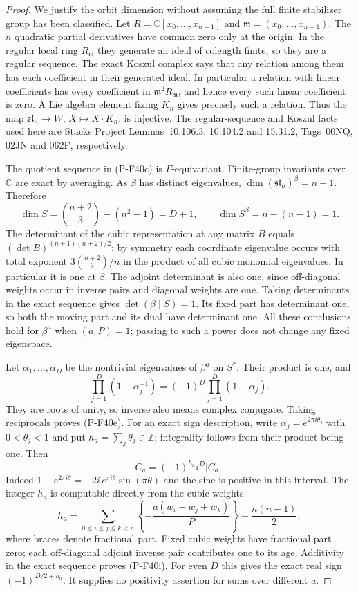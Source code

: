 \documentclass[11pt,a4paper]{article}
\begin{document}
\begin{proof}
We justify the orbit dimension without assuming the full
finite stabilizer group has been classified. Let
$R=\mathbb C[x_0,\ldots,x_{n-1}]$ and
$\mathfrak m=(x_0,\ldots,x_{n-1})$.
The $n$ quadratic partial derivatives have common zero only
at the origin. In the regular local ring $R_{\mathfrak m}$
they generate an ideal of colength finite, so they are a
regular sequence. The exact Koszul complex says that any
relation among them has each coefficient in their generated
ideal. In particular a relation with linear coefficients
has every coefficient in $\mathfrak m^2R_{\mathfrak m}$,
and hence every such linear coefficient is zero.
A Lie algebra element fixing $K_n$ gives precisely such a
relation. Thus the map
$\mathfrak{sl}_n\to W$, $X\mapsto X\cdot K_n$,
is injective. The regular-sequence and Koszul facts used
here are Stacks Project Lemmas~10.106.3, 10.104.2 and
15.31.2, Tags~00NQ, 02JN and 062F, respectively.

The quotient sequence in (P-F40c) is $\Gamma$-equivariant.
Finite-group invariants over $\mathbb C$ are exact by
averaging. As $\beta$ has distinct eigenvalues,
$\dim(\mathfrak{sl}_n)^\beta=n-1$. Therefore
\[
 \dim S=\binom{n+2}{3}-(n^2-1)=D+1,
 \qquad \dim S^\beta=n-(n-1)=1.
\]
The determinant of the cubic representation at any matrix
$B$ equals $(\det B)^{(n+1)(n+2)/2}$: by symmetry each
coordinate eigenvalue occurs with total exponent
$3\binom{n+2}{3}/n$ in the product of all cubic monomial
eigenvalues. In particular it is one at $\beta$.
The adjoint determinant is also one, since off-diagonal
weights occur in inverse pairs and diagonal weights are one.
Taking determinants in the exact sequence gives
$\det(\beta\mid S)=1$. Its fixed part has determinant one,
so both the moving part and its dual have determinant one.
All these conclusions hold for $\beta^a$ when $(a,P)=1$;
passing to such a power does not change any fixed eigenspace.

Let $\alpha_1,\ldots,\alpha_D$ be the nontrivial eigenvalues
of $\beta^a$ on $S^*$. Their product is one, and
\[
 \prod_{j=1}^D(1-\alpha_j^{-1})
     =(-1)^D\prod_{j=1}^D(1-\alpha_j).
\]
They are roots of unity, so inverse also means complex
conjugate. Taking reciprocals proves (P-F40e).
For an exact sign description, write
$\alpha_j=e^{2\pi i\theta_j}$ with $0<\theta_j<1$ and put
$h_a=\sum_j\theta_j\in\mathbb Z$; integrality follows
from their product being one. Then
\[
 C_a=(-1)^{h_a}i^D |C_a|.
 \tag{P-F40h}
\]
Indeed $1-e^{2\pi i\theta}=-2i\,e^{\pi i\theta}
\sin(\pi\theta)$ and the sine is positive in this interval.
The integer $h_a$ is computable directly from the cubic
weights:
\[
 h_a=\sum_{0\le i\le j\le k<n}
       \left\{-\frac{a(w_i+w_j+w_k)}P\right\}
                   -\frac{n(n-1)}2,
 \tag{P-F40i}
\]
where braces denote fractional part. Fixed cubic weights
have fractional part zero; each off-diagonal adjoint inverse
pair contributes one to its age. Additivity in the exact
sequence proves (P-F40i).
For even $D$ this gives the exact real sign
$(-1)^{D/2+h_a}$. It supplies no positivity assertion for
sums over different $a$.


\end{proof}
\end{document}
